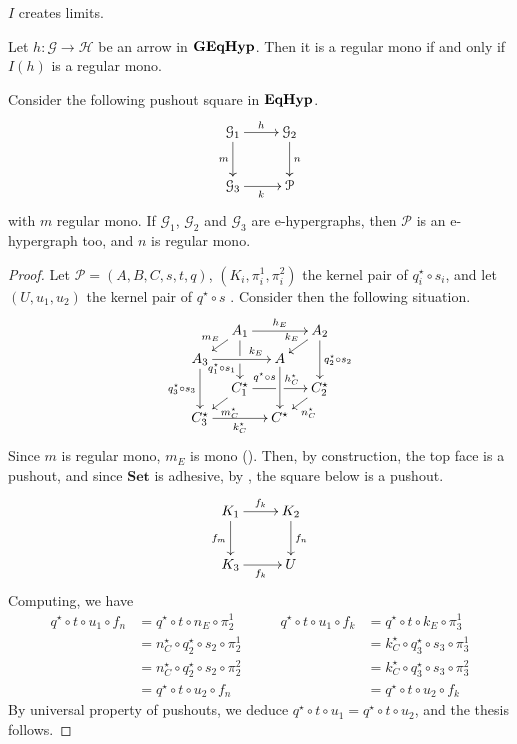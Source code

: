\documentclass[a4paper,UKenglish,cleveref,pdftex,thm-restate,numberwithinsect]{lipics-v2021}
\newcommand{\Set}{\mathbf{Set}}
\newcommand{\catname}[1]{\textbf{\textup{#1}}}
\newcommand{\EqHyp}{\catname{EqHyp}} %
\newcommand{\egg}{\catname{GEqHyp}}
\begin{document}
\begin{corollary}
	$I$ creates limits.
\end{corollary}

\begin{corollary}
	Let $h: \mathcal{G \to H}$ be an arrow in $\egg$. Then it is a regular mono 
	if and only if $I(h)$ is a regular mono.
\end{corollary}

\begin{lemma}
	Consider the following pushout square in $\EqHyp$.
	\[\xymatrix{\mathcal{G}_1 \ar[r]^{h}\ar[d]_{m}&\mathcal{G}_2\ar[d]^{n}\\\mathcal{G}_3\ar[r]_{k}&\mathcal{P}}\]
	with $m$ regular mono. If $\mathcal{G}_1$, $\mathcal{G}_2$ and $\mathcal{G}_3$ are e-hypergraphs, then $\mathcal{P}$ is an e-hypergraph too, and $n$ is regular mono.
\end{lemma}

\begin{proof}
	Let $\mathcal{P} = (A, B, C, s, t, q)$, $(K_i, \pi_i^1, \pi_i^2)$ the kernel pair of $q_i^\star \circ s_i$, and let $(U, u_1, u_2)$ the kernel pair of $q^\star \circ s$ .
	Consider then the following situation.
	\[\xymatrix@C=10pt@R=6pt{&A_1\ar[dd]|\hole_(.65){q_1^\star \circ s_1}\ar[rr]^{h_E} \ar[dl]_{m_E} && A_2 \ar[dd]^{q_2^\star \circ s_2} \ar[dl]_{k_E} \\ A_3 \ar[dd]_{q_3^\star \circ s_3}\ar[rr]^(.7){k_E} & & A \ar[dd]_(.3){q^\star \circ s}\\&{C_1^\star}\ar[rr]|\hole^(.65){h_C^\star}\ar[dl]^{m_C^\star} && {C_2^\star} \ar[dl]^{n_C^\star} \\{C_3^\star} \ar[rr]_{k_C^\star} & & C^\star}\]
	Since $m$ is regular mono, $m_E$ is mono ({\color{red}{inserire citazione}}).
	Then, by construction, the top face is a pushout, and since $\Set$ is adhesive, by  , the square below is a pushout.
	\[\xymatrix{K_1\ar[r]^{f_k}\ar[d]_{f_m}&K_2\ar[d]^{f_n}\\K_3\ar[r]_{f_k}&U}\]
	Computing, we have
	\[
	\begin{split}
		q^\star \circ t \circ u_1 \circ f_n &= q^\star \circ t \circ n_E \circ \pi_2^1 \\ &= n_C^\star \circ q_2^\star \circ s_2 \circ \pi_2^1 \\&= n_C^\star \circ q_2^\star \circ s_2 \circ \pi_2^2 \\&=q^\star \circ t \circ u_2 \circ f_n 
	\end{split}
	\qquad
	\begin{split} q^\star \circ t \circ u_1 \circ f_k &= q^\star \circ t \circ k_E \circ \pi_3^1 \\ &= k_C^\star \circ q_3^\star \circ s_3 \circ \pi_3^1 \\&= k_C^\star \circ q_3^\star \circ s_3 \circ \pi_3^2 \\&=q^\star \circ t \circ u_2 \circ f_k
	\end{split}
	\]
	By universal property of pushouts, we deduce $q^\star \circ t \circ u_1 = q^\star \circ t \circ u_2$, and the thesis follows.
\end{proof}
\end{document}
